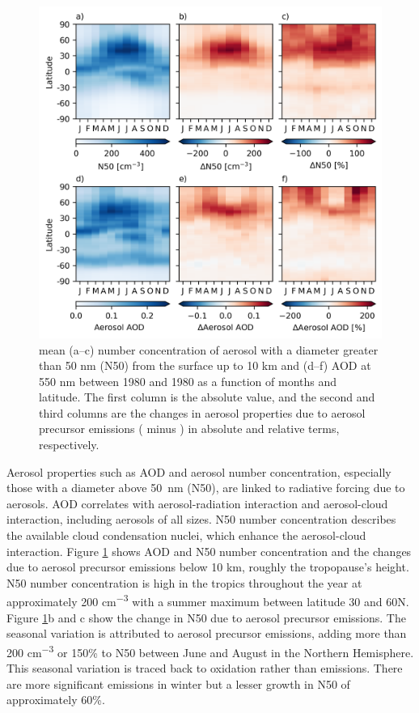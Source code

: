 \begin{figure}
    \centering
    \includegraphics{Chapter4/Figs/seasonal_aerosol_props_1980.png}
    \caption[Mean AOD at 550 nm and N50 between 1980 and 1989 as a function of months and latitude due to aerosol precursor emissions]{mean (a--c) number concentration of aerosol with a diameter greater than 50 nm (N50) from the surface up to 10 km and (d--f) AOD at 550 nm between 1980 and 1980 as a function of months and latitude. The first column is the absolute value, and the second and third columns are the changes in aerosol properties due to aerosol precursor emissions (\histsst{} minus \sstpiaer{}) in absolute and relative terms, respectively.}
    \label{fig:ch4:seasonal-aerosol-props}
\end{figure}


Aerosol properties such as AOD and aerosol number concentration, especially those with a diameter above \qty{50}{nm} (N50), are linked to radiative forcing due to aerosols. AOD correlates with aerosol-radiation interaction and aerosol-cloud interaction, including aerosols of all sizes. N50 number concentration describes the available cloud condensation nuclei, which enhance the aerosol-cloud interaction. Figure \ref{fig:ch4:seasonal-aerosol-props} shows AOD and N50 number concentration and the changes due to aerosol precursor emissions below 10 km, roughly the tropopause's height. N50 number concentration is high in the tropics throughout the year at approximately 200 \unit{cm^{-3}} with a summer maximum between latitude 30 and 60\textdegree N. Figure \ref{fig:ch4:seasonal-aerosol-props}b and c show the change in N50 due to aerosol precursor emissions. The seasonal variation is attributed to aerosol precursor emissions, adding more than 200 \unit{cm^{-3}} or 150\% to N50 between June and August in the Northern Hemisphere. This seasonal variation is traced back to oxidation rather than emissions. There are more significant  emissions in winter but a lesser growth in N50 of approximately 60\%.

